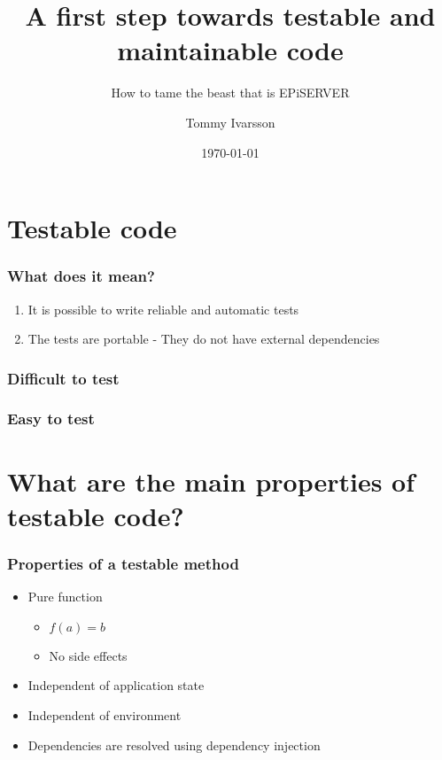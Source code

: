 \documentclass{beamer}
\title{A first step towards testable and maintainable code}
\subtitle{How to tame the beast that is EPiSERVER}
\author{Tommy Ivarsson}
\date{\today}
\begin{document}
	\setcounter{showProgressBar}{0}
	\setcounter{showSlideNumbers}{0}

	\frame{\titlepage}

	\setcounter{framenumber}{0}
	\setcounter{showProgressBar}{1}
	\setcounter{showSlideNumbers}{1}
	\section{Testable code}
		\begin{frame}
			\frametitle{What does it mean?}
			\begin{enumerate}
				\item It is possible to write reliable and automatic tests \pause
				\item The tests are portable - They do not have external dependencies
			\end{enumerate}
		\end{frame}
		\begin{frame}
			\frametitle{Difficult to test}
		\end{frame}
		\begin{frame}
			\frametitle{Easy to test}
		\end{frame}

	\section{What are the main properties of testable code?}
		\begin{frame}
			\frametitle{Properties of a testable method} \pause
			\begin{itemize}
				\item Pure function \pause
				\begin{itemize}
					\item $f(a) = b$ \pause
					\item No side effects \pause
				\end{itemize}
				\item Independent of application state \pause
				\item Independent of environment \pause
				\item Dependencies are resolved using dependency injection
			\end{itemize}
		\end{frame}
\end{document}
